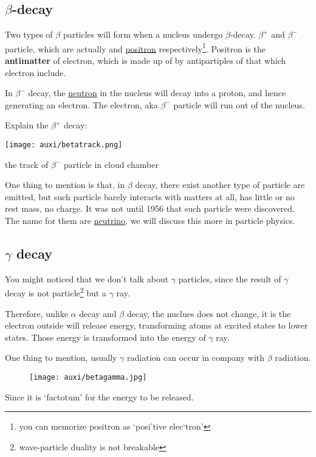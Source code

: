 \documentclass[a4paper]{tufte-handout}
\newenvironment{TaskBox} %
{\begin{tcolorbox}[breakable,colback=b1!30,colframe=b1,title=Task]} {\end{tcolorbox}}
\begin{document}
\subsection{$\beta$-decay}
Two types of $\beta$ particles will form when a nucleus undergo $\beta$-decay. $\beta^+$ and $\beta^-$ particle, which are actually \uline{\hspace{4em}} and \uline{positron} respectively\footnote{you can memorize positron as `posi'tive elec`tron'}. Positron is the \textbf{antimatter} of electron, which is made up of by antipartiples of that which electron include.

In $\beta^-$ decay, the \uline{neutron} in the nucleus will decay into a proton, and hence generating an electron. The electron, aka $\beta^-$ particle will run out of the nucleus. 

\begin{TaskBox}
Explain the $\beta^+$ decay:
\vspace{1.5in}
\end{TaskBox}

\begin{marginfigure}
\centering
\texttt{[image: auxi/betatrack.png]}
\caption{the track of $\beta^-$ particle in cloud chamber}
\end{marginfigure}

One thing to mention is that, in $\beta$ decay, there exist another type of particle are emitted, but such particle barely interacts with matters at all, has little or no rest mass, no charge. It was not until 1956 
that such particle were discovered. The name for them are \href{https://www.scientificamerican.com/article/what-is-a-neutrino/}{neutrino}, we will discuss this more in particle physics.


\subsection{$\gamma$ decay}
You might noticed that we don't talk about $\gamma$ particles, since the result of $\gamma$ decay is not particle\footnote{wave-particle duality is not breakable} but a $\gamma$ ray.

Therefore, unlike $\alpha$ decay and $\beta$ decay, the nuclues does not change, it is the electron outside will release energy, transforming atoms at excited states to lower states. Those energy is transformed into the energy of $\gamma$ ray.

One thing to mention, usually $\gamma$ radiation can occur in company with $\beta$ radiation.
\begin{figure}[h]
\centering
\texttt{[image: auxi/betagamma.jpg]}
\end{figure}
Since it is `factotum' for the energy to be released.
\end{document}
